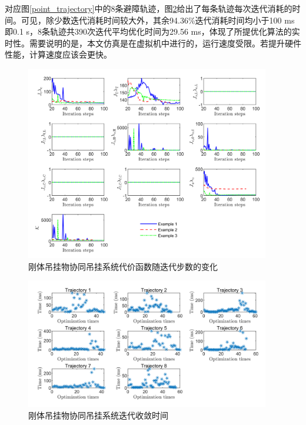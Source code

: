 对应图\ref{point_trajectory}中的8条避障轨迹，图\ref{point_time}给出了每条轨迹每次迭代消耗的时间。可见，除少数迭代消耗时间较大外，其余94.36\%迭代消耗时间均小于100 ms即0.1 s，8条轨迹共390次迭代平均优化时间为29.56 ms，体现了所提优化算法的实时性。需要说明的是，本文仿真是在虚拟机中进行的，运行速度受限。若提升硬件性能，计算速度应该会更快。

\begin{figure}[htb!]
    \centering
    \includegraphics[width = 0.95\textwidth]{fig/figure_chap6/cost_point.png}
    \caption{刚体吊挂物协同吊挂系统代价函数随迭代步数的变化\label{point_cost}}
\end{figure}

\begin{figure}[htb!]
    \centering
    \includegraphics[width = 0.95\textwidth]{fig/figure_chap6/time_point.png}
    \caption{刚体吊挂物协同吊挂系统迭代收敛时间\label{point_time}}
\end{figure}

